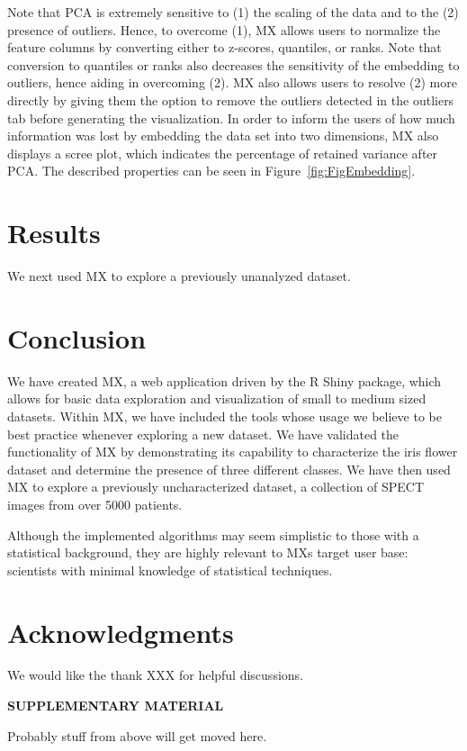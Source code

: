 \documentclass[12pt]{article}
\begin{document}
Note that PCA is extremely sensitive to (1) the scaling of the data and to the (2) presence of outliers.  Hence, to overcome (1), MX allows users to normalize the feature columns by converting either to z-scores, quantiles, or ranks. Note that conversion to quantiles or ranks also decreases the sensitivity of the embedding to outliers, hence aiding in overcoming (2). MX also allows users to resolve (2) more directly by giving them the option to remove the outliers detected in the outliers tab before generating the visualization. In order to inform the users of how much information was lost by embedding the data set into two dimensions, MX also displays a scree plot, which indicates the percentage of retained variance after PCA. The described properties can be seen in Figure~\ref{fig:FigEmbedding}.

\section{Results}
\label{sec:res}
We next used MX to explore a previously unanalyzed dataset.

\section{Conclusion}
\label{sec:conc}

We have created MX, a web application driven by the R Shiny package, which allows for basic data exploration and visualization of small to medium sized datasets. Within MX, we have included the tools whose usage we believe to be best practice whenever exploring a new dataset. We have validated the functionality of MX by demonstrating its capability to characterize the iris flower dataset and determine the presence of three different classes. We have then used MX to explore a previously uncharacterized dataset, a collection of SPECT images from over 5000 patients.

Although the implemented algorithms may seem simplistic to those with a statistical background, they are highly relevant to MXs target user base: scientists with minimal knowledge of statistical techniques.

\section{Acknowledgments}
\label{sec:ack}
We would like the thank XXX for helpful discussions.

\bigskip
\begin{center}
{\large\bf SUPPLEMENTARY MATERIAL}
\end{center}

Probably stuff from above will get moved here.




\end{document}
